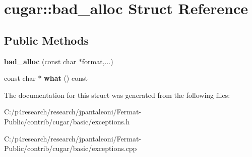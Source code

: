 \hypertarget{structcugar_1_1bad__alloc}{}\section{cugar\+:\+:bad\+\_\+alloc Struct Reference}
\label{structcugar_1_1bad__alloc}
\subsection*{Public Methods}
\begin{DoxyCompactItemize}
\item 
\mbox{\label{structcugar_1_1bad__alloc_ae127aaace0d669ca246c180a568817e8}} 
{\bfseries bad\+\_\+alloc} (const char $\ast$format,...)
\item 
\mbox{\label{structcugar_1_1bad__alloc_a7ac12426981b3b78e5d27c10f347cb75}} 
const char $\ast$ {\bfseries what} () const
\end{DoxyCompactItemize}


The documentation for this struct was generated from the following files\+:\begin{DoxyCompactItemize}
\item 
C\+:/p4research/research/jpantaleoni/\+Fermat-\/\+Public/contrib/cugar/basic/exceptions.\+h\item 
C\+:/p4research/research/jpantaleoni/\+Fermat-\/\+Public/contrib/cugar/basic/exceptions.\+cpp\end{DoxyCompactItemize}
